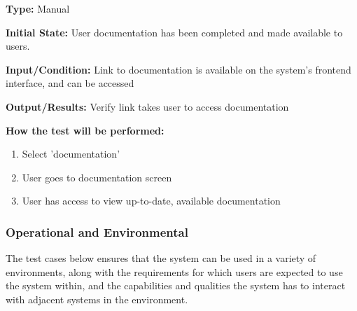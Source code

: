 \documentclass[12pt, titlepage]{article}
\begin{document}
\begin{itemize}
  \begin{mdframed}[linewidth=0.5mm]
      \textbf{Type:} Manual \par
      \textbf{Initial State:} User documentation has been completed and made available to users. \par
      \textbf{Input/Condition:} Link to documentation is available on the system's frontend interface, and can be accessed\par
      \textbf{Output/Results:} Verify link takes user to access documentation \par
      \textbf{How the test will be performed:}
      \begin{enumerate}[noitemsep]
        \item Select 'documentation'
        \item User goes to documentation screen
        \item User has access to view up-to-date, available documentation
      \end{enumerate}
  \end{mdframed}
\end{itemize}

\subsubsection{Operational and Environmental}
\hspace{2em}The test cases below ensures that the system can be used in a variety of environments,
along with the requirements for which users are expected to use the system within, and the capabilities
and qualities the system has to interact with adjacent systems in the environment.
\end{document}
